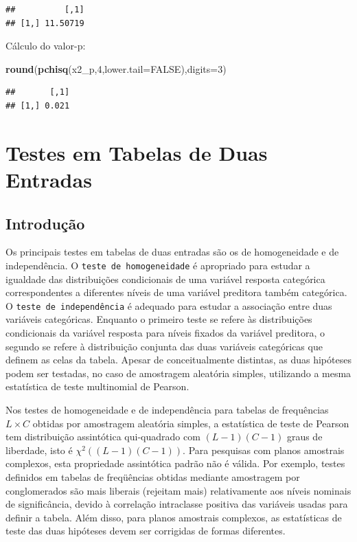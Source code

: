 \documentclass[]{book}
\newenvironment{Shaded}{\begin{snugshade}}{\end{snugshade}}
\newcommand{\KeywordTok}[1]{\textcolor[rgb]{0.13,0.29,0.53}{\textbf{{#1}}}}
\newcommand{\DataTypeTok}[1]{\textcolor[rgb]{0.13,0.29,0.53}{{#1}}}
\newcommand{\DecValTok}[1]{\textcolor[rgb]{0.00,0.00,0.81}{{#1}}}
\newcommand{\OtherTok}[1]{\textcolor[rgb]{0.56,0.35,0.01}{{#1}}}
\newcommand{\NormalTok}[1]{{#1}}
\numberwithin{example}{chapter}
\numberwithin{remark}{chapter}
\numberwithin{definition}{chapter}
\begin{document}
\begin{verbatim}
##          [,1]
## [1,] 11.50719
\end{verbatim}

Cálculo do valor-p:

\begin{Shaded}
\begin{Highlighting}[]
\KeywordTok{round}\NormalTok{(}\KeywordTok{pchisq}\NormalTok{(x2_p,}\DecValTok{4}\NormalTok{,}\DataTypeTok{lower.tail=}\OtherTok{FALSE}\NormalTok{),}\DataTypeTok{digits=}\DecValTok{3}\NormalTok{)}
\end{Highlighting}
\end{Shaded}

\begin{verbatim}
##       [,1]
## [1,] 0.021
\end{verbatim}

\chapter{Testes em Tabelas de Duas Entradas}\label{testetab2}

\section{Introdução}\label{introducao-2}

Os principais testes em tabelas de duas entradas são os de homogeneidade
e de independência. O \texttt{teste\ de\ homogeneidade} é apropriado
para estudar a igualdade das distribuições condicionais de uma variável
resposta categórica correspondentes a diferentes níveis de uma variável
preditora também categórica. O \texttt{teste\ de\ independência} é
adequado para estudar a associação entre duas variáveis categóricas.
Enquanto o primeiro teste se refere às distribuições condicionais da
variável resposta para níveis fixados da variável preditora, o segundo
se refere à distribuição conjunta das duas variáveis categóricas que
definem as celas da tabela. Apesar de conceitualmente distintas, as duas
hipóteses podem ser testadas, no caso de amostragem aleatória simples,
utilizando a mesma estatística de teste multinomial de Pearson.

Nos testes de homogeneidade e de independência para tabelas de
frequências \(L\times C\) obtidas por amostragem aleatória simples, a
estatística de teste de Pearson tem distribuição assintótica
qui-quadrado com \((L-1)(C-1)\) graus de liberdade, isto é
\(\chi ^{2}\left( (L-1)(C-1)\right)\). Para pesquisas com planos
amostrais complexos, esta propriedade assintótica padrão não é válida.
Por exemplo, testes definidos em tabelas de freqüências obtidas mediante
amostragem por conglomerados são mais liberais (rejeitam mais)
relativamente aos níveis nominais de significância, devido à correlação
intraclasse positiva das variáveis usadas para definir a tabela. Além
disso, para planos amostrais complexos, as estatísticas de teste das
duas hipóteses devem ser corrigidas de formas diferentes.
\end{document}
